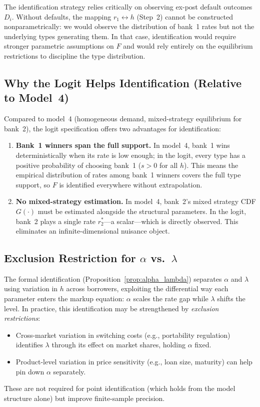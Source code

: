 \documentclass[12pt]{article}
\theoremstyle{plain}
\theoremstyle{plain}
\theoremstyle{definition}  %
\theoremstyle{remark}  %
\begin{document}
The identification strategy relies critically on observing ex-post default outcomes $D_i$. Without defaults, the mapping $r_1 \leftrightarrow h$ (Step~2) cannot be constructed nonparametrically: we would observe the distribution of bank~1 rates but not the underlying types generating them. In that case, identification would require stronger parametric assumptions on $F$ and would rely entirely on the equilibrium restrictions to discipline the type distribution.

\subsection{Why the Logit Helps Identification (Relative to Model~4)}

Compared to model~4 (homogeneous demand, mixed-strategy equilibrium for bank~2), the logit specification offers two advantages for identification:

\begin{enumerate}
    \item \textbf{Bank~1 winners span the full support.} In model~4, bank~1 wins deterministically when its rate is low enough; in the logit, every type has a positive probability of choosing bank~1 ($s > 0$ for all $h$). This means the empirical distribution of rates among bank~1 winners covers the full type support, so $F$ is identified everywhere without extrapolation.
    
    \item \textbf{No mixed-strategy estimation.} In model~4, bank~2's mixed strategy CDF $G(\cdot)$ must be estimated alongside the structural parameters. In the logit, bank~2 plays a single rate $r_2^*$---a scalar---which is directly observed. This eliminates an infinite-dimensional nuisance object.
\end{enumerate}

\subsection{Exclusion Restriction for $\alpha$ vs.\ $\lambda$}

The formal identification (Proposition~\ref{prop:alpha_lambda}) separates $\alpha$ and $\lambda$ using variation in $h$ across borrowers, exploiting the differential way each parameter enters the markup equation: $\alpha$ scales the rate gap while $\lambda$ shifts the level. In practice, this identification may be strengthened by \emph{exclusion restrictions}:
\begin{itemize}
    \item Cross-market variation in switching costs (e.g., portability regulation) identifies $\lambda$ through its effect on market shares, holding $\alpha$ fixed.
    \item Product-level variation in price sensitivity (e.g., loan size, maturity) can help pin down $\alpha$ separately.
\end{itemize}
These are not required for point identification (which holds from the model structure alone) but improve finite-sample precision.
\end{document}
